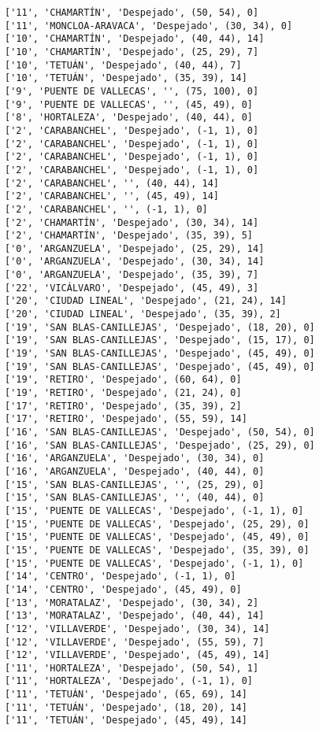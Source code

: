 \documentclass[11pt]{article}
\begin{document}
\begin{Verbatim}[commandchars=\\\{\}]
['11', 'CHAMARTÍN', 'Despejado', (50, 54), 0]
['11', 'MONCLOA-ARAVACA', 'Despejado', (30, 34), 0]
['10', 'CHAMARTÍN', 'Despejado', (40, 44), 14]
['10', 'CHAMARTÍN', 'Despejado', (25, 29), 7]
['10', 'TETUÁN', 'Despejado', (40, 44), 7]
['10', 'TETUÁN', 'Despejado', (35, 39), 14]
['9', 'PUENTE DE VALLECAS', '', (75, 100), 0]
['9', 'PUENTE DE VALLECAS', '', (45, 49), 0]
['8', 'HORTALEZA', 'Despejado', (40, 44), 0]
['2', 'CARABANCHEL', 'Despejado', (-1, 1), 0]
['2', 'CARABANCHEL', 'Despejado', (-1, 1), 0]
['2', 'CARABANCHEL', 'Despejado', (-1, 1), 0]
['2', 'CARABANCHEL', 'Despejado', (-1, 1), 0]
['2', 'CARABANCHEL', '', (40, 44), 14]
['2', 'CARABANCHEL', '', (45, 49), 14]
['2', 'CARABANCHEL', '', (-1, 1), 0]
['2', 'CHAMARTÍN', 'Despejado', (30, 34), 14]
['2', 'CHAMARTÍN', 'Despejado', (35, 39), 5]
['0', 'ARGANZUELA', 'Despejado', (25, 29), 14]
['0', 'ARGANZUELA', 'Despejado', (30, 34), 14]
['0', 'ARGANZUELA', 'Despejado', (35, 39), 7]
['22', 'VICÁLVARO', 'Despejado', (45, 49), 3]
['20', 'CIUDAD LINEAL', 'Despejado', (21, 24), 14]
['20', 'CIUDAD LINEAL', 'Despejado', (35, 39), 2]
['19', 'SAN BLAS-CANILLEJAS', 'Despejado', (18, 20), 0]
['19', 'SAN BLAS-CANILLEJAS', 'Despejado', (15, 17), 0]
['19', 'SAN BLAS-CANILLEJAS', 'Despejado', (45, 49), 0]
['19', 'SAN BLAS-CANILLEJAS', 'Despejado', (45, 49), 0]
['19', 'RETIRO', 'Despejado', (60, 64), 0]
['19', 'RETIRO', 'Despejado', (21, 24), 0]
['17', 'RETIRO', 'Despejado', (35, 39), 2]
['17', 'RETIRO', 'Despejado', (55, 59), 14]
['16', 'SAN BLAS-CANILLEJAS', 'Despejado', (50, 54), 0]
['16', 'SAN BLAS-CANILLEJAS', 'Despejado', (25, 29), 0]
['16', 'ARGANZUELA', 'Despejado', (30, 34), 0]
['16', 'ARGANZUELA', 'Despejado', (40, 44), 0]
['15', 'SAN BLAS-CANILLEJAS', '', (25, 29), 0]
['15', 'SAN BLAS-CANILLEJAS', '', (40, 44), 0]
['15', 'PUENTE DE VALLECAS', 'Despejado', (-1, 1), 0]
['15', 'PUENTE DE VALLECAS', 'Despejado', (25, 29), 0]
['15', 'PUENTE DE VALLECAS', 'Despejado', (45, 49), 0]
['15', 'PUENTE DE VALLECAS', 'Despejado', (35, 39), 0]
['15', 'PUENTE DE VALLECAS', 'Despejado', (-1, 1), 0]
['14', 'CENTRO', 'Despejado', (-1, 1), 0]
['14', 'CENTRO', 'Despejado', (45, 49), 0]
['13', 'MORATALAZ', 'Despejado', (30, 34), 2]
['13', 'MORATALAZ', 'Despejado', (40, 44), 14]
['12', 'VILLAVERDE', 'Despejado', (30, 34), 14]
['12', 'VILLAVERDE', 'Despejado', (55, 59), 7]
['12', 'VILLAVERDE', 'Despejado', (45, 49), 14]
['11', 'HORTALEZA', 'Despejado', (50, 54), 1]
['11', 'HORTALEZA', 'Despejado', (-1, 1), 0]
['11', 'TETUÁN', 'Despejado', (65, 69), 14]
['11', 'TETUÁN', 'Despejado', (18, 20), 14]
['11', 'TETUÁN', 'Despejado', (45, 49), 14]

\end{Verbatim}
\end{document}

